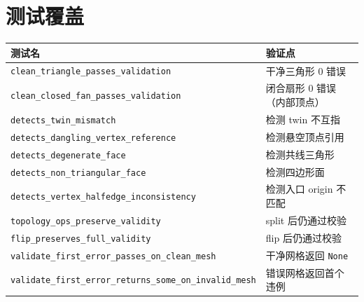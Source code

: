 \documentclass[11pt,a4paper]{article}
\begin{document}
\section{测试覆盖}

\begin{center}
\renewcommand{\arraystretch}{1.18}
\begin{tabular}{@{}ll@{}}
  \toprule
  \textbf{测试名} & \textbf{验证点} \\
  \midrule
  \texttt{clean\_triangle\_passes\_validation}       & 干净三角形 0 错误 \\
  \texttt{clean\_closed\_fan\_passes\_validation}    & 闭合扇形 0 错误（内部顶点） \\
  \texttt{detects\_twin\_mismatch}                   & 检测 twin 不互指 \\
  \texttt{detects\_dangling\_vertex\_reference}      & 检测悬空顶点引用 \\
  \texttt{detects\_degenerate\_face}                 & 检测共线三角形 \\
  \texttt{detects\_non\_triangular\_face}            & 检测四边形面 \\
  \texttt{detects\_vertex\_halfedge\_inconsistency}  & 检测入口 origin 不匹配 \\
  \texttt{topology\_ops\_preserve\_validity}         & split 后仍通过校验 \\
  \texttt{flip\_preserves\_full\_validity}           & flip 后仍通过校验 \\
  \texttt{validate\_first\_error\_passes\_on\_clean\_mesh}    & 干净网格返回 \texttt{None} \\
  \texttt{validate\_first\_error\_returns\_some\_on\_invalid\_mesh} & 错误网格返回首个违例 \\
  \bottomrule
\end{tabular}
\end{center}
\end{document}
